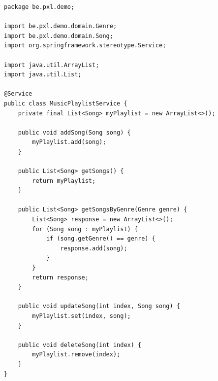\begin{lstlisting}
package be.pxl.demo;

import be.pxl.demo.domain.Genre;
import be.pxl.demo.domain.Song;
import org.springframework.stereotype.Service;

import java.util.ArrayList;
import java.util.List;

@Service
public class MusicPlaylistService {
	private final List<Song> myPlaylist = new ArrayList<>();

	public void addSong(Song song) {
		myPlaylist.add(song);
	}

	public List<Song> getSongs() {
		return myPlaylist;
	}

	public List<Song> getSongsByGenre(Genre genre) {
		List<Song> response = new ArrayList<>();
		for (Song song : myPlaylist) {
			if (song.getGenre() == genre) {
				response.add(song);
			}
		}
		return response;
	}

	public void updateSong(int index, Song song) {
		myPlaylist.set(index, song);
	}

	public void deleteSong(int index) {
		myPlaylist.remove(index);
	}
}
\end{lstlisting}


